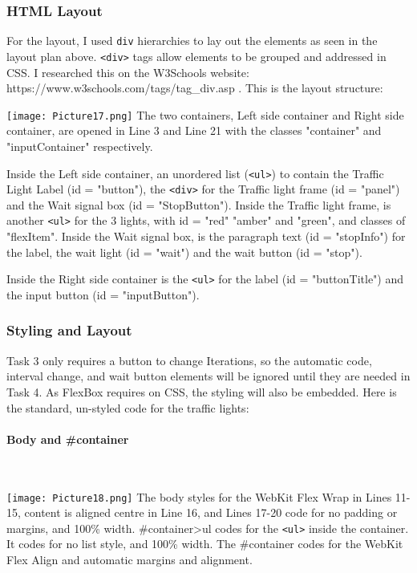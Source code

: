 \documentclass[a4paper]{article}
\begin{document}
\subsubsection{HTML Layout}
For the layout, I used \verb|div| hierarchies to lay out the elements as seen in the layout plan above. \verb|<div>| tags allow elements to be grouped and addressed in CSS. I researched this on the W3Schools website: https://www.w3schools.com/tags/tag\_div.asp . This is the layout structure: \par
\noindent\texttt{[image: Picture17.png]}
The two containers, Left side container and Right side container, are opened in Line 3 and Line 21 with the classes "container" and "inputContainer" respectively. \par
Inside the Left side container, an unordered list (\verb|<ul>|) to contain the Traffic Light Label (id = "button"), the \verb|<div>| for the Traffic light frame (id = "panel") and the 	Wait signal box (id = "StopButton"). Inside the Traffic light frame, is another \verb|<ul>| for the 3 lights, with id = "red" "amber" and "green", and classes of "flexItem". Inside the Wait signal box, is the paragraph text (id = "stopInfo") for the label, the wait light (id = "wait") and the wait button (id = "stop"). \par
Inside the Right side container is the \verb|<ul>| for the label (id = "buttonTitle") and the input button (id = "inputButton").
\subsubsection{Styling and Layout}
Task 3 only requires a button to change Iterations, so the automatic code, interval change, and wait button elements will be ignored until they are needed in Task 4. As FlexBox requires on CSS, the styling will also be embedded. Here is the standard, un-styled code for the traffic lights: \par
\paragraph{Body and \#container}
~\par
\noindent\texttt{[image: Picture18.png]}
The body styles for the WebKit Flex Wrap in Lines 11-15, content is aligned centre in Line 16, and Lines 17-20 code for no padding or margins, and 100\% width. \#container\textgreater ul codes for the \verb|<ul>| inside the container. It codes for no list style, and 100\% width. The \#container codes for the WebKit Flex Align and automatic margins and alignment. \newpage
\end{document}
